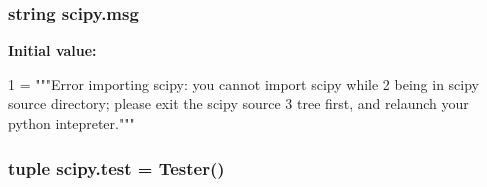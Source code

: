\subsubsection[{msg}]{\setlength{\rightskip}{0pt plus 5cm}string scipy.\+msg}\label{namespacescipy_a66f2847a32f57566cf14418f8b8f90bf}
{\bfseries Initial value\+:}
\begin{DoxyCode}
1 = \textcolor{stringliteral}{"""Error importing scipy: you cannot import scipy while}
2 \textcolor{stringliteral}{        being in scipy source directory; please exit the scipy source}
3 \textcolor{stringliteral}{        tree first, and relaunch your python intepreter."""}
\end{DoxyCode}
\hypertarget{namespacescipy_a70e74008e7f71f6d1523b809c579467a}{}
\subsubsection[{test}]{\setlength{\rightskip}{0pt plus 5cm}tuple scipy.\+test = Tester()}\label{namespacescipy_a70e74008e7f71f6d1523b809c579467a}
